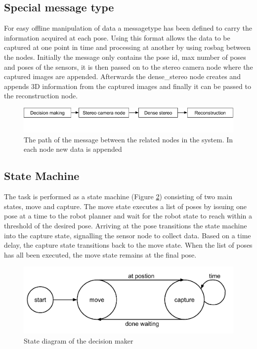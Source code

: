 
\subsection{Special message type}
For easy offline manipulation of data a messagetype has been defined to carry the information acquired at each pose. Using this format allows the data to be captured at one point in time and processing at another by using rosbag between the nodes. Initially the message only contains the pose id, max number of poses and poses of the sensors, it is then passed on to the stereo camera node where the captured images are appended. Afterwards the dense\_stereo node creates and appends 3D information from the captured images and finally it can be passed to the reconstruction node.

\begin{figure}[htb]
	\begin{center}
		\includegraphics[scale=0.5,trim=0 50 0 0]{graphics/04_decisionmaking/message_path.png}%
		\caption{The path of the message between the related nodes in the system. In each node new data is appended}
		\label{fig:message_path}
	\end{center}
\end{figure}

\subsection{State Machine}
The task is performed as a state machine (Figure \ref{fig:state_diagram}) consisting of two main states, move and capture. The move state executes a list of poses by issuing one pose at a time to the robot planner and wait for the robot state to reach within a threshold of the desired pose. Arriving at the pose transitions the state machine into the capture state, signalling the sensor node to collect data. Based on a time delay, the capture state transitions back to the move state. When the list of poses has all been executed, the move state remains at the final pose.


\begin{figure}[htb]
	\begin{center}
		\includegraphics[scale=0.5,trim=0 0 0 0]{graphics/04_decisionmaking/state_diagram.pdf}%
		\caption{State diagram of the decision maker}
		\label{fig:state_diagram}
	\end{center}
\end{figure}
